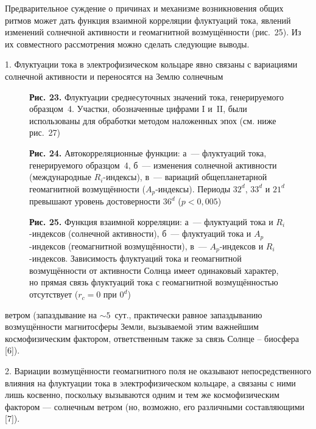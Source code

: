 \documentclass[12pt,a4paper]{article}
\begin{document}
Предварительное суждение о причинах и механизме возникновения общих ритмов
может дать функция взаимной корреляции флуктуаций тока, явлений изменений
солнечной активности и геомагнитной возмущённости (рис.~25). Из их совместного
рассмотрения можно сделать следующие выводы.

1. Флуктуации тока в электрофизическом кольцаре явно связаны с вариациями
солнечной активности и переносятся на Землю солнечным

\begin{figure}[h]
\centering
\caption*{\textbf{Рис. 23.} Флуктуации среднесуточных значений тока,
генерируемого образцом~4. Участки, обозначенные цифрами I и~II, были
использованы для обработки методом наложенных эпох (см. ниже рис.~27)}
\end{figure}

\begin{figure}[h]
\centering
\caption*{\textbf{Рис. 24.} Автокорреляционные функции: а~— флуктуаций тока,
генерируемого образцом~4, б~— изменения солнечной активности (международные
$R_i$-индексы), в~— вариаций общепланетарной геомагнитной возмущённости
($A_p$-индексы). Периоды $32^d$, $33^d$ и $21^d$ превышают уровень
достоверности $36^d$ ($p < 0{,}005$)}
\end{figure}

\begin{figure}[h]
\centering
\caption*{\textbf{Рис. 25.} Функция взаимной корреляции: а~— флуктуаций тока
и $R_i$-индексов (солнечной активности), б~— флуктуаций тока и $A_p$-индексов
(геомагнитной возмущённости), в~— $A_p$-индексов и $R_i$-индексов.
Зависимость флуктуаций тока и геомагнитной возмущённости от активности
Солнца имеет одинаковый характер, но прямая связь флуктуаций тока с
геомагнитной возмущённостью отсутствует ($r_c = 0$ при $0^d$)}
\end{figure}

\newpage

ветром (запаздывание на $\sim 5$~сут., практически равное запаздыванию
возмущённости магнитосферы Земли, вызываемой этим важнейшим
космофизическим фактором, ответственным также за связь Солнце -- биосфера
[6]).

2. Вариации возмущённости геомагнитного поля не оказывают непосредственного
влияния на флуктуации тока в электрофизическом кольцаре, а связаны с ними
лишь косвенно, поскольку вызываются одним и тем же космофизическим фактором
— солнечным ветром (но, возможно, его различными составляющими [7]).
\end{document}

